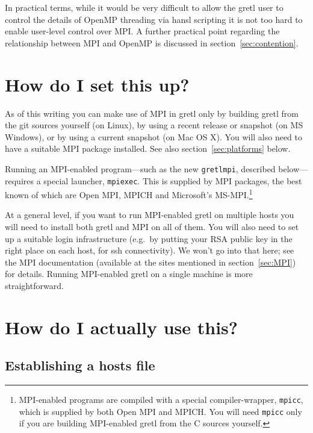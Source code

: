 \documentclass{article}
\begin{document}
In practical terms, while it would be very difficult to allow the
gretl user to control the details of \textsf{OpenMP} threading via
hansl scripting it is not too hard to enable user-level control over
MPI.  A further practical point regarding the relationship between MPI
and \textsf{OpenMP} is discussed in section~\ref{sec:contention}.

\section{How do I set this up?}
\label{sec:setup}

As of this writing you can make use of MPI in gretl only by building
gretl from the git sources yourself (on Linux), by using a recent
release or snapshot (on MS Windows), or by using a current snapshot
(on Mac OS X). You will also need to have a suitable MPI package
installed. See also section~\ref{sec:platforms} below.

Running an MPI-enabled program---such as the new \texttt{gretlmpi},
described below---requires a special launcher, \texttt{mpiexec}.  This
is supplied by MPI packages, the best known of which are \textsf{Open
  MPI}, \textsf{MPICH} and Microsoft's
\textsf{MS-MPI}.\footnote{MPI-enabled programs are compiled with a
  special compiler-wrapper, \texttt{mpicc}, which is supplied by both
  \textsf{Open MPI} and \textsf{MPICH}. You will need \texttt{mpicc}
  only if you are building MPI-enabled gretl from the C sources
  yourself.}

At a general level, if you want to run MPI-enabled gretl on multiple
hosts you will need to install both gretl and MPI on all of them. You
will also need to set up a suitable login infrastructure (e.g.\ by
putting your RSA public key in the right place on each host, for
\textsf{ssh} connectivity).  We won't go into that here; see the MPI
documentation (available at the sites mentioned in
section~\ref{sec:MPI}) for details. Running MPI-enabled gretl on a
single machine is more straightforward.

\section{How do I actually use this?}
\label{sec:usage}

\subsection{Establishing a hosts file}
\label{subsec:hosts}
\end{document}
